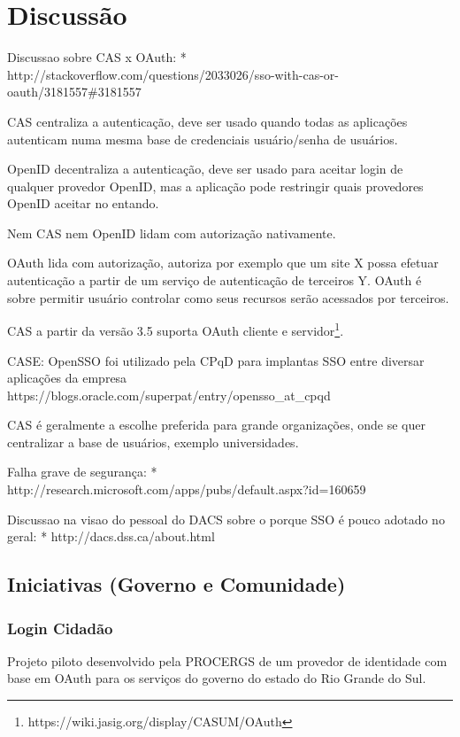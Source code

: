 \documentclass[11pt]{article}
\begin{document}
\section{Discussão}

Discussao sobre CAS x OAuth:
* http://stackoverflow.com/questions/2033026/sso-with-cas-or-oauth/3181557\#3181557

CAS centraliza a autenticação, deve ser usado quando todas as aplicações
autenticam numa mesma base de credenciais usuário/senha de usuários.

OpenID decentraliza a autenticação, deve ser usado para aceitar login de
qualquer provedor OpenID, mas a aplicação pode restringir quais provedores
OpenID aceitar no entando.

Nem CAS nem OpenID lidam com autorização nativamente.

OAuth lida com autorização, autoriza por exemplo que um site X possa efetuar
autenticação a partir de um serviço de autenticação de terceiros Y. OAuth é
sobre permitir usuário controlar como seus recursos serão acessados por
terceiros.

CAS a partir da versão 3.5 suporta OAuth cliente e
servidor\footnote{https://wiki.jasig.org/display/CASUM/OAuth}.

CASE: OpenSSO foi utilizado pela CPqD para implantas SSO entre diversar aplicações
da empresa https://blogs.oracle.com/superpat/entry/opensso\_at\_cpqd

CAS é geralmente a escolhe preferida para grande organizações, onde se quer
centralizar a base de usuários, exemplo universidades.

Falha grave de segurança:
* http://research.microsoft.com/apps/pubs/default.aspx?id=160659

Discussao na visao do pessoal do DACS sobre o porque SSO é pouco adotado no
geral:
* http://dacs.dss.ca/about.html

\subsection{Iniciativas (Governo e Comunidade)}

\subsubsection{Login Cidadão}

Projeto piloto desenvolvido pela PROCERGS de um provedor de identidade com
base em OAuth para os serviços do governo do estado do Rio Grande do Sul.
\end{document}
